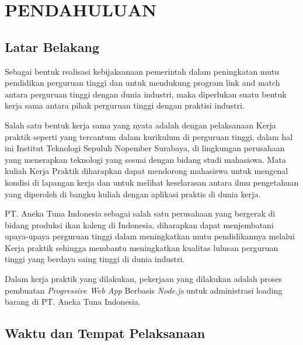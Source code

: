 \chapter{PENDAHULUAN}
\vspace{4ex}

\setlength{\parindent}{7ex}


\section{Latar Belakang}
\vspace{1ex}

Sebagai bentuk realisasi kebijaksanaan pemerintah dalam peningkatan mutu pendidikan perguruan tinggi dan untuk mendukung program link and match antara perguruan tinggi dengan dunia industri, maka diperlukan suatu bentuk kerja sama antara pihak perguruan tinggi dengan praktisi industri.
\vspace{0.5ex}

Salah satu bentuk kerja sama yang nyata adalah dengan pelaksanaan Kerja praktik seperti yang tercantum dalam kurikulum di perguruan tinggi, dalam hal ini Institut Teknologi Sepuluh Nopember Surabaya, di lingkungan perusahaan yang menerapkan teknologi yang sesuai dengan bidang studi mahasiswa.
Mata kuliah Kerja Praktik diharapkan dapat mendorong mahasiswa untuk mengenal kondisi di lapangan kerja dan untuk melihat keselarasan antara ilmu pengetahuan yang diperoleh di bangku kuliah dengan aplikasi praktis di dunia kerja.
\vspace{0.5ex}

PT. Aneka Tuna Indonesia sebagai salah satu perusahaan yang bergerak di bidang produksi ikan kaleng di Indonesia, diharapkan dapat menjembatani upaya-upaya perguruan tinggi dalam meningkatkan mutu pendidikannya melalui Kerja praktik sehingga membantu meningkatkan kualitas lulusan perguruan tinggi yang berdaya saing tinggi di dunia industri.
\vspace{0.5ex}

Dalam kerja praktik yang dilakukan, pekerjaan yang dilakukan adalah proses pembuatan \emph{Progressive Web App} Berbasis \emph{Node.js} untuk administrasi loading barang di PT. Aneka Tuna Indonesia.

\section{Waktu dan Tempat Pelaksanaan}
\vspace{1ex}

